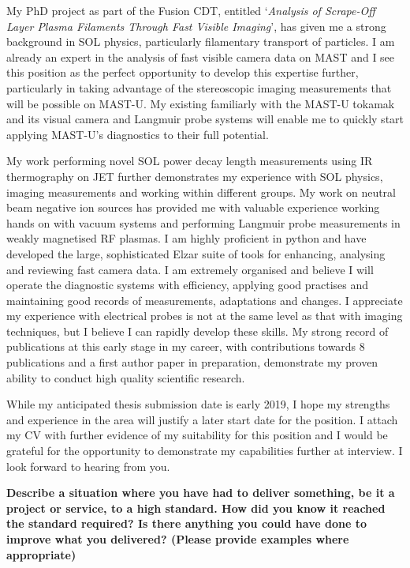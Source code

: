 \documentclass[11pt,a4paper,sans]{moderncv}        %
\begin{document}
My PhD project as part of the Fusion CDT, entitled `\textit{Analysis of Scrape-Off Layer Plasma Filaments Through Fast Visible Imaging}', has given me a strong background in SOL physics, particularly filamentary transport of particles.
I am already an expert in the analysis of fast visible camera data on MAST and I see this position as the perfect opportunity to develop this expertise further, particularly in taking advantage of the stereoscopic imaging measurements that will be possible on MAST-U.
My existing familiarly with the MAST-U tokamak and its visual camera and Langmuir probe systems will enable me to quickly start applying MAST-U's diagnostics to their full potential.

My work performing novel SOL power decay length measurements using IR thermography on JET further demonstrates my experience with SOL physics, imaging measurements and working within different groups.
My work on neutral beam negative ion sources has provided me with valuable experience working hands on with vacuum systems and performing Langmuir probe measurements in weakly magnetised RF plasmas.
I am highly proficient in python and have developed the large, sophisticated Elzar suite of tools for enhancing, analysing and reviewing fast camera data.
I am extremely organised and believe I will operate the diagnostic systems with efficiency, applying good practises and maintaining good records of measurements, adaptations and changes.
I appreciate my experience with electrical probes is not at the same level as that with imaging techniques, but I believe I can rapidly develop these skills.
My strong record of publications at this early stage in my career, with contributions towards 8 publications and a first author paper in preparation, demonstrate my proven ability to conduct high quality scientific research.

While my anticipated thesis submission date is early 2019, I hope my strengths and experience in the area will justify a later start date for the position.
I attach my CV with further evidence of my suitability for this position and I would be grateful for the opportunity to demonstrate my capabilities further at interview. I look forward to hearing from you.

\makeletterclosing

\newpage
\textbf{Describe a situation where you have had to deliver something, be it a project or service, to a high standard. How did you know it reached the standard required? Is there anything you could have done to improve what you delivered? (Please provide examples where appropriate)	}
\end{document}
